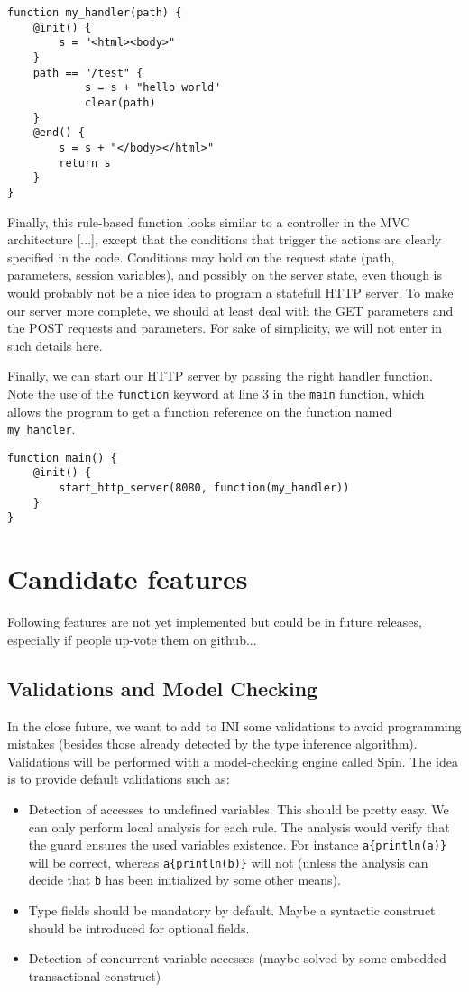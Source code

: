 \documentclass[11pt]{report}
\begin{document}
\begin{lstlisting}
function my_handler(path) {
	@init() {
		s = "<html><body>"
	}
	path == "/test" {
			s = s + "hello world"
			clear(path)
	}
	@end() {
		s = s + "</body></html>"
		return s
	}
}
\end{lstlisting}

Finally, this rule-based function looks similar to a controller in the MVC architecture [...], except that the conditions that trigger the actions are clearly specified in the code. Conditions may hold on the request state (path, parameters, session variables), and possibly on the server state, even though is would probably not be a nice idea to program a statefull HTTP server. To make our server more complete, we should at least deal with the GET parameters and the POST requests and parameters. For sake of simplicity, we will not enter in such details here.

Finally, we can start our HTTP server by passing the right handler function. Note the use of the \texttt{function} keyword at line 3 in the \texttt{main} function, which allows the program to get a function reference on the function named \texttt{my\_handler}.

\begin{lstlisting}
function main() {
	@init() {
		start_http_server(8080, function(my_handler))
	}
}
\end{lstlisting}

\chapter{Candidate features}

Following features are not yet implemented but could be in future releases, especially if people up-vote them on github...

\section{Validations and Model Checking}

In the close future, we want to add to INI some validations to avoid programming mistakes (besides those already detected by the type inference algorithm). Validations will be performed with a model-checking engine called Spin. The idea is to provide default validations such as:

\begin{itemize}
\item Detection of accesses to undefined variables. This should be pretty easy. We can only perform local analysis for each rule. The analysis would verify that the guard ensures the used variables existence. For instance \texttt{a\{println(a)\}} will be correct, whereas \texttt{a\{println(b)\}} will not (unless the analysis can decide that \texttt{b} has been initialized by some other means).
\item Type fields should be mandatory by default. Maybe a syntactic construct should be introduced for optional fields.
\item Detection of concurrent variable accesses (maybe solved by some embedded transactional construct)
\end{itemize}
\end{document}
